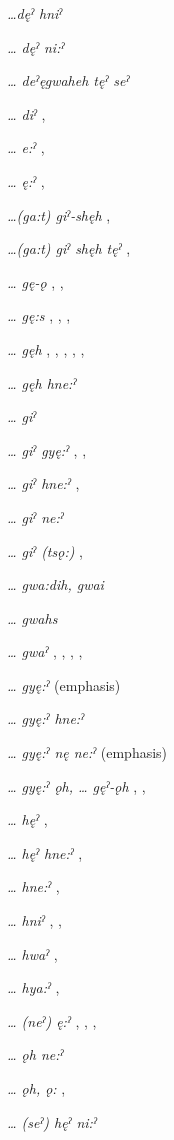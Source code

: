 \begin{multicols}{2}


\textit{…dęˀ hniˀ} 

\textit{… dęˀ ni:ˀ} 

\textit{… deˀęgwaheh tęˀ seˀ} 

\textit{… diˀ} , 

\textit{… e:ˀ} , 

\textit{… ę:ˀ} , 

\textit{…(ga:t) giˀ-shęh} , 

\textit{…(ga:t) giˀ shęh tęˀ} , 

\textit{… gę-ǫ} , , 

\textit{… gę:s} , , , 

\textit{… gęh} , , , , , 

\textit{… gęh hne:ˀ} 

\textit{… giˀ} 

\textit{… giˀ gyę:ˀ} , , 

\textit{… giˀ hne:ˀ} , 

\textit{… giˀ ne:ˀ} 

\textit{… giˀ (tsǫ:)} , 

\textit{… gwa:dih, gwai} 

\textit{… gwahs} 

\textit{… gwaˀ} , , , , 

\textit{… gyę:ˀ} (emphasis)

\textit{… gyę:ˀ hne:ˀ} 

\textit{… gyę:ˀ nę ne:ˀ} (emphasis)

\textit{… gyę:ˀ ǫh, … gęˀ-ǫh} , , 

\textit{… hęˀ} , 

\textit{… hęˀ hne:ˀ} , 

\textit{… hne:ˀ} , 

\textit{… hniˀ} , , 

\textit{… hwaˀ} , 

\textit{… hya:ˀ} , 

\textit{… (neˀ) ę:ˀ} , , , 

\textit{… ǫh ne:ˀ} 

\textit{… ǫh, ǫ:} , 

\textit{… (seˀ) hęˀ ni:ˀ} 
\end{multicols}
\z

